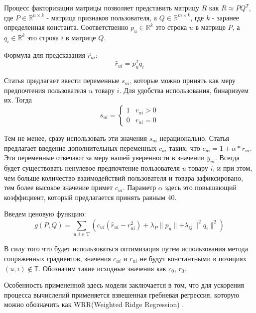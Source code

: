 \documentclass[14pt]{mmcs_article}
\begin{document}
Процесс факторизации матрицы позволяет представить матрицу $R$ как $R \approx P Q^T$, где $P \in  \mathbb {R}^{n\times k}$ - матрица признаков пользователя, а  $Q \in  \mathbb {R}^{m\times k}$, где $k$ - заранее определенная константа. 
Соответственно $p_u \in \mathbb {R}^{k}$ это строка $u$ в матрице $P$, а $q_i \in \mathbb {R}^{k}$ это строка $i$ в матрице $Q$. 

Формула для предсказания  $\hat{r}_{ui}$:
\begin{equation}
	 \hat{r}_{ui} = p_u^T q_i
\end{equation}

Статья \cite{ALS:CFIFD} предлагает ввести переменные $s_{ui}$, которые можно принять как меру предпочтения пользователя $u$ товару $i$. Для удобства использования, бинаризуем их. Тогда
\begin{equation}
	s_{ui} = \begin{cases}
		1 & r_{ui} > 0 \\
		0 & r_{ui} = 0
	\end{cases}
\end{equation}

Тем не менее, сразу использовать эти значения $s_{ui}$ нерационально. Статья \cite{ALS:CFIFD} предлагает введение дополнительных переменных $c_{ui}$ таких, что $c_{ui} = 1 + \alpha * r_{ui}$. Эти переменные отвечают за меру нашей уверенности в значении $y_{ui}$.  Всегда будет существовать ненулевое предпочтение пользователя $u$ товару $i$, и при этом, чем больше количество взаимодействий пользователя и товара зафиксировано, тем более высокое значение примет $c_{ui}$. Параметр $\alpha$ здесь это повышающий коэффициент, который предлагается принять равным 40. 


Введем ценовую функцию:
\begin{equation}
	g(P, Q) = \sum_{u, i \in \mathrm{T}} (c_{ui}(\hat{r}_{ui} - r_{ui}^2) + \lambda_P\parallel p_u \parallel + \lambda_Q\parallel^2 q_i \parallel^2) 
\end{equation}

В силу того что будет использоваться оптимизация путем использования метода сопряженных градиентов, значения $c_{ui}$ и $r_{ui}$ не будут константными в позициях $(u,i) \not\in \mathbb{T}$. Обозначим такие исходные значения как $c_0$, $r_0$.

Особенность примененной здесь модели заключается в том, что для ускорения процесса вычислений применяется взвешенная гребневая регрессия, которую можно обозначить как WRR(Weighted Ridge Regression) \cite{implicit:all}.
\end{document}
